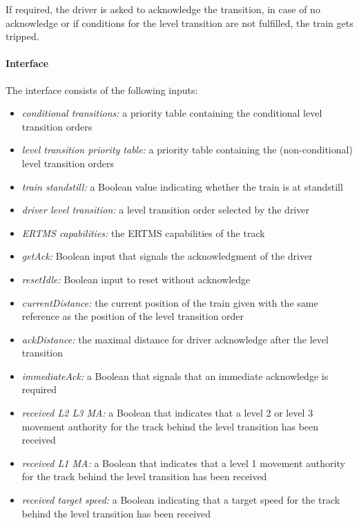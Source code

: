 If required, the driver is asked to acknowledge the transition, in case of no acknowledge or if conditions for the level transition are not fulfilled, the train gets tripped.

\paragraph{Interface}

The interface consists of the following inputs:

\begin{itemize}
\item \emph{conditional transitions:} a priority table containing the
  conditional level transition orders
\item \emph{level transition priority table:} a priority table containing the
  (non-conditional) level transition orders
\item \emph{train standstill:} a Boolean value indicating whether the train is
  at standstill
\item \emph{driver level transition:} a level transition order selected by the
  driver
\item \emph{ERTMS capabilities:} the ERTMS capabilities of the track
\item \emph{getAck:} Boolean input that signals the acknowledgment of the
  driver
\item \emph{resetIdle:} Boolean input to reset without acknowledge
\item \emph{currentDistance:} the current position of the train given with the
  same reference as the position of the level transition order
\item \emph{ackDistance:} the maximal distance for driver acknowledge after
  the level transition
\item \emph{immediateAck:} a Boolean that signals that an immediate acknowledge
  is required
\item \emph{received L2 L3 MA:} a Boolean that indicates that a level 2 or level
  3 movement authority for the track behind the level transition has been
  received
\item \emph{received L1 MA:} a Boolean that indicates that a level 1 movement
  authority for the track behind the level transition has been received
\item \emph{received target speed:} a Boolean indicating that a target speed for
  the track behind the level transition has been received
\end{itemize}


